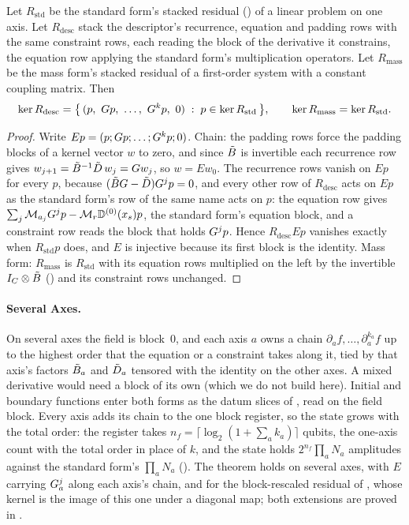 \begin{theorem}
\label{thm:kernel-equivalence}
Let $R_{\mathrm{std}}$ be the standard form's stacked residual () of a linear problem on one axis. Let $R_{\mathrm{desc}}$ stack the descriptor's recurrence, equation and padding rows with the same constraint rows, each reading the block of the derivative it constrains, the equation row applying the standard form's multiplication operators. Let $R_{\mathrm{mass}}$ be the mass form's stacked residual of a first-order system with a constant coupling matrix. Then
\begin{equation}
    \ker R_{\mathrm{desc}} = \bigl\{\, (p,\ G p,\ \dots,\ G^{k} p,\ 0) \;:\; p \in \ker R_{\mathrm{std}} \,\bigr\},
    \qquad
    \ker R_{\mathrm{mass}} = \ker R_{\mathrm{std}} .
    \label{eq:kernel-equivalence}
\end{equation}
\end{theorem}
\begin{proof}
Write $Ep=(p;G p;\dots;G^kp;0)$. Chain: the padding rows force the padding blocks of a kernel vector $w$ to zero, and since $\tilde{B}$ is invertible each recurrence row gives $w_{j+1}=\tilde{B}^{-1}\tilde{D}\,w_j=G w_j$, so $w=Ew_0$. The recurrence rows vanish on $Ep$ for every $p$, because $(\tilde{B}G-\tilde{D})G^jp=0$, and every other row of $R_{\mathrm{desc}}$ acts on $Ep$ as the standard form's row of the same name acts on $p$: the equation row gives $\sum_j\mathcal{M}_{a_j}G^jp-\mathcal{M}_r\mathbb{D}^{(0)}(x_s)p$, the standard form's equation block, and a constraint row reads the block that holds $G^jp$. Hence $R_{\mathrm{desc}}Ep$ vanishes exactly when $R_{\mathrm{std}}p$ does, and $E$ is injective because its first block is the identity. Mass form: $R_{\mathrm{mass}}$ is $R_{\mathrm{std}}$ with its equation rows multiplied on the left by the invertible $I_C\otimes\tilde{B}$ () and its constraint rows unchanged.
\end{proof}

\paragraph{Several Axes.} On several axes the field is block~$0$, and each axis $a$ owns a chain $\partial_af,\dots,\partial_a^{k_a}f$ up to the highest order that the equation or a constraint takes along it, tied by that axis's factors $\tilde{B}_a$ and $\tilde{D}_a$ tensored with the identity on the other axes. A mixed derivative would need a block of its own (which we do not build here). Initial and boundary functions enter both forms as the datum slices of , read on the field block. Every axis adds its chain to the one block register, so the state grows with the total order: the register takes $n_f=\lceil\log_2(1+\sum_ak_a)\rceil$ qubits, the one-axis count with the total order in place of $k$, and the state holds $2^{n_f}\prod_aN_a$ amplitudes against the standard form's $\prod_aN_a$ (). The theorem holds on several axes, with $E$ carrying $G_a^{j}$ along each axis's chain, and for the block-rescaled residual of , whose kernel is the image of this one under a diagonal map; both extensions are proved in .

